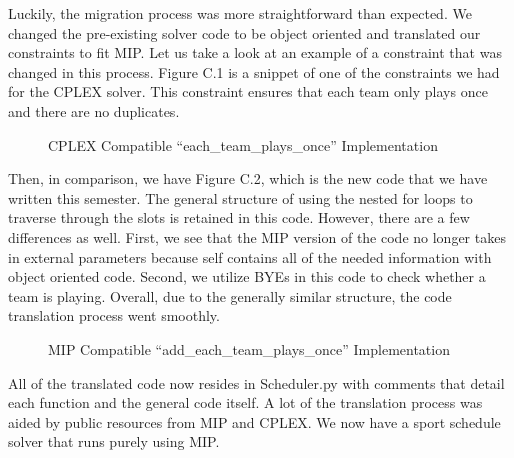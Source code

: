 \documentclass[book]{hmcclinic}
\begin{document}
Luckily, the migration process was more straightforward than expected. We changed the pre-existing solver code to be object oriented and translated our constraints to fit MIP. Let us take a look at an example of a constraint that was changed in this process. Figure C.1 is a snippet of one of the constraints we had for the CPLEX solver. This constraint ensures that each team only plays once and there are no duplicates. 

\begin{figure}[h]
    \centering
    \caption{CPLEX Compatible “each\_team\_plays\_once” Implementation}
\end{figure}

Then, in comparison, we have Figure C.2, which is the new code that we have written this semester. The general structure of using the nested for loops to traverse through the slots is retained in this code. However, there are a few differences as well. First, we see that the MIP version of the code no longer takes in external parameters because self contains all of the needed information with object oriented code. Second, we utilize BYEs in this code to check whether a team is playing. Overall, due to the generally similar structure, the code translation process went smoothly. 

\begin{figure}[h]
    \centering
    \caption{MIP Compatible “add\_each\_team\_plays\_once” Implementation}
\end{figure}


All of the translated code now resides in Scheduler.py with comments that detail each function and the general code itself. A lot of the translation process was aided by public resources from MIP and CPLEX. We now have a sport schedule solver that runs purely using MIP.



\end{document}
